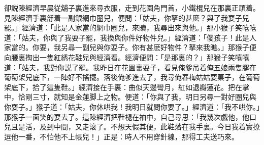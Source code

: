 卻説陳經濟早晨従舖子裏進來尋衣服，走到花園角門首，小鐵棍兒在那裏正頑着。見陳經濟手裏㧱着一副銀網巾圈兒，便問：「姑夫，你拏的甚麽？與了我耍子兒罷。」經濟道：「此是人家當的網巾圈兒，來贖，我尋出來與他。」那小猴子笑嘻嘻道：「姑夫，你與了我耍子罷，我換與你件好物件兒。」經濟道：「儍孩子！此是人家當的。你要，我另尋一副兒與你耍子。你有甚麽好物件？拏來我瞧。」那猴子便向腰裏掏出一隻紅綉花鞋兒與經濟看。經濟便問：「是那裏的？」那猴子笑嘻嘻道：「姑夫，我對你説了罷。我昨日在花園裏耍子，看見俺爹吊着俺五娘兩隻腿在葡萄架兒底下，一陣好不搖擺。落後俺爹進去了，我尋俺春梅姑姑要菓子，在葡萄架底下，拾了這隻鞋。」經濟接在手裏：曲似天邊彎月，紅如退瓣蓮花。把在掌中，恰剛三寸，就知是金蓮脚上之物。便道：「你與了我，明日另尋一對好圈兒與你耍子。」猴子道：「姑夫，你休哄我！我明日就問你要了。」經濟道：「我不哄你。」那猴子一面笑的耍去了。這陳經濟把鞋褪在袖中，自己尋思：「我幾次戯他，他口兒且是活，及到中間，又走滚了。不想天假其便，此鞋落在我手裏。今日我着實撩逗他一番，不怕他不上帳兒！」正是：時人不用穿針線，那得工夫送巧來。

